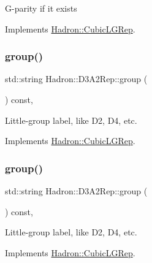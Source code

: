 G-\/parity if it exists 

Implements \mbox{\hyperlink{structHadron_1_1CubicLGRep_ace26f7b2d55e3a668a14cb9026da5231}{Hadron\+::\+Cubic\+L\+G\+Rep}}.

\mbox{\label{structHadron_1_1D3A2Rep_aca0f5e39c00819bb490bfd5e9cf82c9e}} 
\subsubsection{\texorpdfstring{group()}{group()}\hspace{0.1cm}{\footnotesize\ttfamily [1/3]}}
{\footnotesize\ttfamily std\+::string Hadron\+::\+D3\+A2\+Rep\+::group (\begin{DoxyParamCaption}{ }\end{DoxyParamCaption}) const\hspace{0.3cm}{\ttfamily [inline]}, {\ttfamily [virtual]}}

Little-\/group label, like D2, D4, etc. 

Implements \mbox{\hyperlink{structHadron_1_1CubicLGRep_a9bdb14b519a611d21379ed96a3a9eb41}{Hadron\+::\+Cubic\+L\+G\+Rep}}.

\mbox{\label{structHadron_1_1D3A2Rep_aca0f5e39c00819bb490bfd5e9cf82c9e}} 
\subsubsection{\texorpdfstring{group()}{group()}\hspace{0.1cm}{\footnotesize\ttfamily [2/3]}}
{\footnotesize\ttfamily std\+::string Hadron\+::\+D3\+A2\+Rep\+::group (\begin{DoxyParamCaption}{ }\end{DoxyParamCaption}) const\hspace{0.3cm}{\ttfamily [inline]}, {\ttfamily [virtual]}}

Little-\/group label, like D2, D4, etc. 

Implements \mbox{\hyperlink{structHadron_1_1CubicLGRep_a9bdb14b519a611d21379ed96a3a9eb41}{Hadron\+::\+Cubic\+L\+G\+Rep}}.

\mbox{\label{structHadron_1_1D3A2Rep_aca0f5e39c00819bb490bfd5e9cf82c9e}} 
